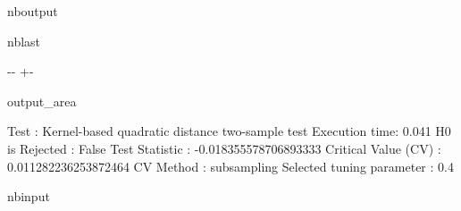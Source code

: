 \documentclass[letterpaper,10pt,english,openany,oneside]{sphinxmanual}
\begin{document}
\begin{sphinxuseclass}{nboutput}
\begin{sphinxuseclass}{nblast}
{

\kern-\sphinxverbatimsmallskipamount\kern-\baselineskip
\kern+\FrameHeightAdjust\kern-\fboxrule
\vspace{\nbsphinxcodecellspacing}

\begin{sphinxuseclass}{output_area}
\begin{sphinxuseclass}{}


\begin{sphinxVerbatim}[commandchars=\\\{\}]
Test : Kernel-based quadratic distance two-sample test
Execution time: 0.041
H0 is Rejected : False
Test Statistic : -0.018355578706893333
Critical Value (CV) : 0.011282236253872464
CV Method : subsampling
Selected tuning parameter : 0.4
\end{sphinxVerbatim}



\end{sphinxuseclass}
\end{sphinxuseclass}
}

\end{sphinxuseclass}
\end{sphinxuseclass}
\begin{sphinxuseclass}{nbinput}
{
\begin{sphinxVerbatim}[commandchars=\\\{\}]
\llap{\color{nbsphinxin}[7]:\,\hspace{\fboxrule}\hspace{\fboxsep}}
\end{sphinxVerbatim}
}

\end{sphinxuseclass}
\end{document}
